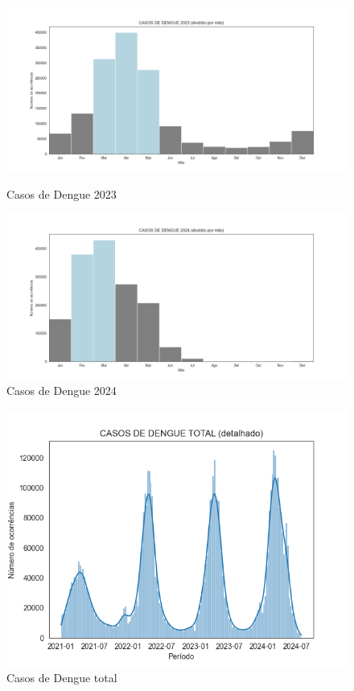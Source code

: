 \documentclass[a4paper, 12pt, twoside]{article}
\begin{document}
\begin{figure}[h]
    \centering
    \begin{minipage}{0.45\textwidth}
        \centering
        \includegraphics[width=\linewidth]{images/casos_dengue_2023.png}
        \caption{Casos de Dengue 2023}
        \label{fig:casos_2023}
    \end{minipage}
    \hfill %
    \begin{minipage}{0.45\textwidth}
        \centering
        \includegraphics[width=\linewidth]{images/casos_dengue_2024.png}
        \caption{Casos de Dengue 2024}
        \label{fig:casos_2024}
    \end{minipage}
\end{figure}

\begin{figure}[H]
    \centering
    \includegraphics[width=0.95\linewidth]{images/casos_dengue_total.png}
    \caption{Casos de Dengue total}
    \label{fig:casos_total}
\end{figure}
\end{document}
